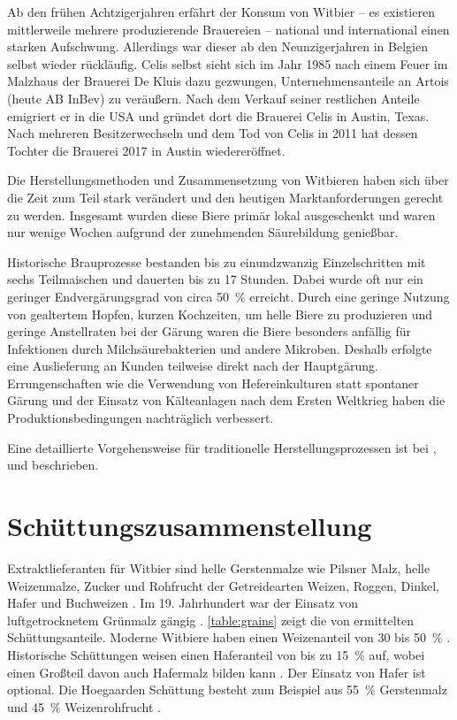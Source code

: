 \documentclass[a4paper,parskip=half]{scrartcl}
\begin{document}
Ab den frühen Achtzigerjahren erfährt der Konsum von Witbier – es
existieren mittlerweile mehrere produzierende Brauereien – national und
international einen starken Aufschwung. Allerdings war dieser
ab den Neunzigerjahren in Belgien selbst wieder rückläufig.
Celis selbst sieht sich im Jahr 1985 nach einem Feuer im Malzhaus der Brauerei
De Kluis dazu gezwungen, Unternehmensanteile an Artois (heute
AB InBev) zu veräußern. Nach dem Verkauf seiner restlichen Anteile
emigriert er in die USA und gründet dort die Brauerei Celis in Austin,
Texas. Nach mehreren Besitzerwechseln und dem Tod von Celis in 2011
hat dessen Tochter die Brauerei 2017 in Austin wiedereröffnet.
\parencites[1]{Strottner1999}[37,49]{Hieronymus2010}{Meewes2017}

Die Herstellungsmethoden und Zusammensetzung von Witbieren haben
sich über die Zeit zum Teil stark verändert und den heutigen
Marktanforderungen gerecht zu werden. Insgesamt wurden diese
Biere primär lokal ausgeschenkt und waren nur wenige
Wochen aufgrund der zunehmenden Säurebildung genießbar.
\parencite[118]{Strottner1999}

Historische Brauprozesse bestanden bis zu einundzwanzig
Einzelschritten mit sechs Teilmaischen und dauerten bis zu
17 Stunden. Dabei wurde oft nur ein geringer Endvergärungsgrad
von circa 50~\% erreicht. Durch eine geringe Nutzung von gealtertem
Hopfen, kurzen Kochzeiten, um helle Biere zu produzieren 
und geringe Anstellraten bei der Gärung waren die Biere besonders
anfällig für Infektionen durch Milchsäurebakterien und andere Mikroben.
Deshalb erfolgte eine Auslieferung an Kunden teilweise direkt nach
der Hauptgärung. Errungenschaften wie die Verwendung von
Hefereinkulturen statt spontaner Gärung und der Einsatz von
Kälteanlagen nach dem Ersten Weltkrieg haben die Produktionsbedingungen
nachträglich verbessert. \parencite[38-41]{Hieronymus2010}

Eine detaillierte Vorgehensweise für traditionelle Herstellungsprozessen
ist bei \citeauthor{Hieronymus2010}, \citeauthor{Mulder2020} und
\citeauthor{Strottner1999} beschrieben.

\section*{Schüttungszusammenstellung}

Extraktlieferanten für Witbier sind helle Gerstenmalze wie Pilsner Malz,
helle Weizenmalze, Zucker und Rohfrucht der Getreidearten Weizen, Roggen,
Dinkel, Hafer und Buchweizen \parencite[14]{Strottner1999}. Im 19.
Jahrhundert war der Einsatz von luftgetrocknetem Grünmalz gängig
\parencite[38]{Hieronymus2010}. \autoref{table:grains} zeigt die von \citeauthor{Strottner1999}
ermittelten Schüttungsanteile. Moderne Witbiere haben einen Weizenanteil
von 30 bis 50~\% \parencite[45]{Mulder2020}. Historische
Schüttungen weisen einen Haferanteil von bis zu 15~\% auf, wobei
einen Großteil davon auch Hafermalz bilden kann \parencite[45]{Hieronymus2010}.
Der Einsatz von Hafer ist optional. Die Hoegaarden Schüttung
besteht zum Beispiel aus 55~\% Gerstenmalz und 45~\% Weizenrohfrucht \parencite[43]{Strottner1999}.
\end{document}
